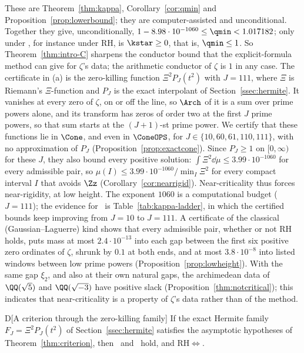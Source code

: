 These are Theorem~\ref{thm:kappa}, Corollary~\ref{cor:qmin} and Proposition~\ref{prop:lowerbound}; they are
computer-assisted and unconditional. Together they give, unconditionally, $1-8.98\cdot10^{-1060}\le\qmin<1.017182$; only under
\condE, for instance under RH, is $\kstar\ge0$, that is, $\qmin\le1$. So Theorem~\ref{thm:intro-C} sharpens the conductor bound that the
explicit-formula method can give for $\zeta$'s data; the arithmetic conductor of $\zeta$ is $1$ in any case. The certificate in (a) is the
zero-killing function $\Xi^2P_J(t^2)$ with $J=111$, where $\Xi$ is Riemann's $\Xi$-function and $P_J$ is the exact interpolant of
Section~\ref{ssec:hermite}. It vanishes at every zero of $\zeta$, on or off the line, so $\Arch$ of it is a sum over prime powers alone, and
its transform has zeros of order two at the first $J$ prime powers, so that sum starts at the $(J+1)$-st prime power. We certify that these
functions lie in $\Cone$, and even in $\ConeOPS$, for $J\in\{10,60,61,110,111\}$, with no approximation of $P_J$
(Proposition~\ref{prop:exactcone}). Since $P_J\ge1$ on $[0,\infty)$ for these $J$, they also bound every positive solution:
$\int\Xi^2\dd\mu\le3.99\cdot10^{-1060}$ for every admissible pair, so $\mu(I)\le3.99\cdot10^{-1060}/\min_I\Xi^2$ for every compact interval $I$ that
avoids $\Zz$ (Corollary~\ref{cor:nearrigid}). Near-criticality thus forces near-rigidity, at low height. The exponent $1060$ is a
computational budget ($J=111$); the evidence for \condS\ is
Table~\ref{tab:kappa-ladder}, in which the certified bounds keep improving from $J=10$ to $J=111$. A certificate of the classical
(Gaussian--Laguerre) kind shows that every admissible pair, whether or not RH holds, puts mass at most $2.4\cdot10^{-13}$ into each gap
between the first six positive zero ordinates of $\zeta$, shrunk by $0.1$ at both ends, and at most $3.8\cdot10^{-8}$ into listed windows between low prime powers
(Proposition~\ref{prop:lowheight}). With the same gap $\xi_2$, and also at their own natural gaps, the archimedean data of $\QQ(\sqrt5)$ and
$\QQ(\sqrt{-3})$ have positive slack (Proposition~\ref{thm:notcritical}); this indicates that near-criticality is a property of $\zeta$'s data
rather than of the method.

\begin{lthm}{D}[A criterion through the zero-killing family]\label{thm:intro-D}
If the exact Hermite family $F_J=\Xi^2P_J(t^2)$ of Section~\ref{ssec:hermite} satisfies the asymptotic hypotheses of
Theorem~\ref{thm:criterion}, then \condS\ and \condU\ hold, and RH$\Leftrightarrow$\condE.
\end{lthm}

